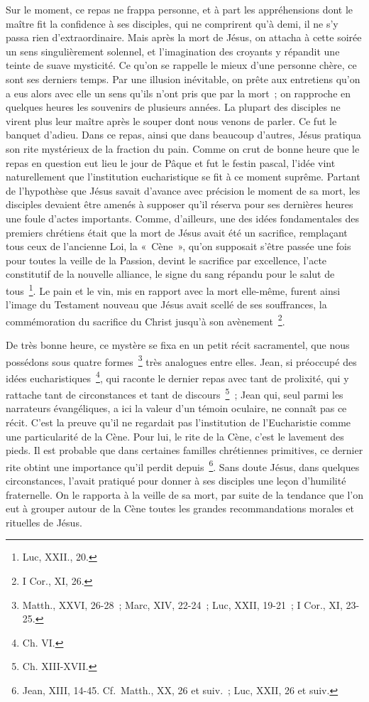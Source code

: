 \documentclass[french,twoside]{book} %
\begin{document}
Sur le moment, ce repas ne frappa personne, et à part les appréhensions dont le maître fit la confidence à ses disciples, qui ne comprirent qu’à demi, il ne s’y passa rien d’extraordinaire. Mais après la mort de Jésus, on attacha à cette soirée un sens singulièrement solennel, et l’imagination des croyants y répandit une teinte de suave mysticité. Ce qu’on se rappelle le mieux d’une personne chère, ce sont ses derniers temps. Par une illusion inévitable, on prête aux entretiens qu’on a eus alors avec elle un sens qu’ils n’ont pris que par la mort ; on rapproche en quelques heures les souvenirs de plusieurs années. La plupart des disciples ne virent plus leur maître après le souper dont nous venons de parler. Ce fut le banquet d’adieu. Dans ce repas, ainsi que dans beaucoup d’autres, Jésus pratiqua son rite mystérieux de la fraction du pain. Comme on crut de bonne heure que le repas en question eut lieu le jour de Pâque et fut le festin pascal, l’idée vint naturellement que l’institution eucharistique se fit à ce moment suprême. Partant de l’hypothèse que Jésus savait d’avance avec précision le moment de sa mort, les disciples devaient être amenés à supposer qu’il réserva pour ses dernières heures une foule d’actes importants. Comme, d’ailleurs, une des idées fondamentales des premiers chrétiens était que la mort de Jésus avait été un sacrifice, remplaçant tous ceux de l’ancienne Loi, la « Cène », qu’on supposait s’être passée une fois pour toutes la veille de la Passion, devint le sacrifice par excellence, l’acte constitutif de la nouvelle alliance, le signe du sang répandu pour le salut de tous \footnote{Luc, XXII., 20.}. Le pain et le vin, mis en rapport avec la mort elle-même, furent ainsi l’image du Testament nouveau que Jésus avait scellé de ses souffrances, la commémoration du sacrifice du Christ jusqu’à son avènement \footnote{I Cor., XI, 26.}.\par
De très bonne heure, ce mystère se fixa en un petit récit sacramentel, que nous possédons sous quatre formes \footnote{Matth., XXVI, 26-28 ; Marc, XIV, 22-24 ; Luc, XXII, 19-21 ; I Cor., XI, 23-25.} très analogues entre elles. Jean, si préoccupé des idées eucharistiques \footnote{Ch. VI.}, qui raconte le dernier repas avec tant de prolixité, qui y rattache tant de circonstances et tant de discours \footnote{Ch. XIII-XVII.} ; Jean qui, seul parmi les narrateurs évangéliques, a ici la valeur d’un témoin oculaire, ne connaît pas ce récit. C’est la preuve qu’il ne regardait pas l’institution de l’Eucharistie comme une particularité de la Cène. Pour lui, le rite de la Cène, c’est le lavement des pieds. Il est probable que dans certaines familles chrétiennes primitives, ce dernier rite obtint une importance qu’il perdit depuis \footnote{Jean, XIII, 14-45. Cf. Matth., XX, 26 et suiv. ; Luc, XXII, 26 et suiv.}. Sans doute Jésus, dans quelques circonstances, l’avait pratiqué pour donner à ses disciples une leçon d’humilité fraternelle. On le rapporta à la veille de sa mort, par suite de la tendance que l’on eut à grouper autour de la Cène toutes les grandes recommandations morales et rituelles de Jésus.\par
\end{document}
